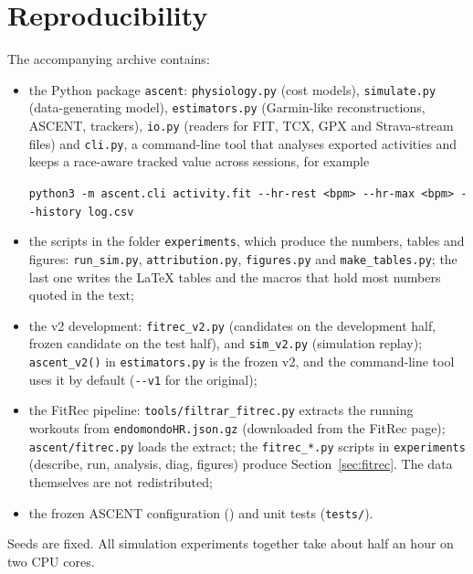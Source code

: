\documentclass[11pt,a4paper]{article}
\newcommand{\ascent}{ASCENT}
\begin{document}
\section{Reproducibility}\label{app:code}
The accompanying archive contains:
\begin{itemize}[leftmargin=*]
\item the Python package \texttt{ascent}: \texttt{physiology.py} (cost models), \texttt{simulate.py} (data-generating model), \texttt{estimators.py} (Garmin-like reconstructions, \ascent, trackers), \texttt{io.py} (readers for FIT, TCX, GPX and Strava-stream files) and \texttt{cli.py}, a command-line tool that analyses exported activities and keeps a race-aware tracked value across sessions, for example
\begin{center}\footnotesize\verb|python3 -m ascent.cli activity.fit --hr-rest <bpm> --hr-max <bpm> --history log.csv|\end{center}
\item the scripts in the folder \texttt{experiments}, which produce the numbers, tables and figures: \texttt{run\_sim.py}, \texttt{attribution.py}, \texttt{figures.py} and \texttt{make\_tables.py}; the last one writes the \LaTeX{} tables and the macros that hold most numbers quoted in the text;
\item the v2 development: \texttt{fitrec\_v2.py} (candidates on the development half, frozen candidate on the test half), and \texttt{sim\_v2.py} (simulation replay); \texttt{ascent\_v2()} in \texttt{estimators.py} is the frozen v2, and the command-line tool uses it by default (\texttt{-{}-v1} for the original);
\item the FitRec pipeline: \texttt{tools/filtrar\_fitrec.py} extracts the running workouts from \texttt{endomondoHR.json.gz} (downloaded from the FitRec page); \texttt{ascent/fitrec.py} loads the extract; the \texttt{fitrec\_*.py} scripts in \texttt{experiments} (describe, run, analysis, diag, figures) produce Section~\ref{sec:fitrec}. The data themselves are not redistributed;
\item the frozen \ascent{} configuration () and unit tests (\texttt{tests/}).
\end{itemize}
Seeds are fixed. All simulation experiments together take about half an hour on two CPU cores.
\end{document}
